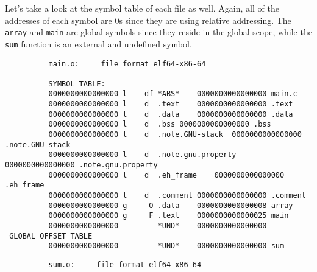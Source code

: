       \begin{example}
        Let's take a look at the symbol table of each file as well. Again, all of the addresses of each symbol are 0s since they are using relative addressing. The \texttt{array} and \texttt{main} are global symbols since they reside in the global scope, while the \texttt{sum} function is an external and undefined symbol.
        \begin{lstlisting}
          main.o:     file format elf64-x86-64

          SYMBOL TABLE:
          0000000000000000 l    df *ABS*	0000000000000000 main.c
          0000000000000000 l    d  .text	0000000000000000 .text
          0000000000000000 l    d  .data	0000000000000000 .data
          0000000000000000 l    d  .bss	0000000000000000 .bss
          0000000000000000 l    d  .note.GNU-stack	0000000000000000 .note.GNU-stack
          0000000000000000 l    d  .note.gnu.property	0000000000000000 .note.gnu.property
          0000000000000000 l    d  .eh_frame	0000000000000000 .eh_frame
          0000000000000000 l    d  .comment	0000000000000000 .comment
          0000000000000000 g     O .data	0000000000000008 array
          0000000000000000 g     F .text	0000000000000025 main
          0000000000000000         *UND*	0000000000000000 _GLOBAL_OFFSET_TABLE_
          0000000000000000         *UND*	0000000000000000 sum
        \end{lstlisting}
        \begin{lstlisting}
          sum.o:     file format elf64-x86-64


\end{lstlisting}
\end{example}
